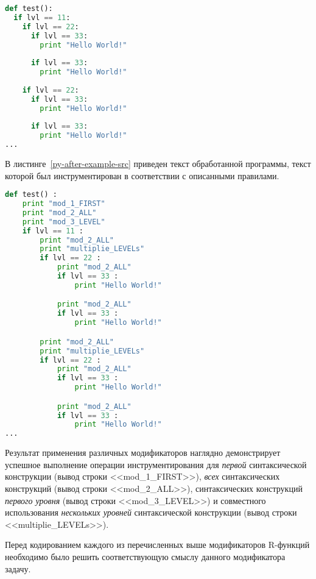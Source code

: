 \begin{lstlisting}[frame=single, language=Python, label={py-before-example-src}, caption={Пример исходной программы на языке Python.}]
def test():
  if lvl == 11:
    if lvl == 22:
      if lvl == 33:
        print "Hello World!"
      
      if lvl == 33:
        print "Hello World!"
    
    if lvl == 22:
      if lvl == 33:
        print "Hello World!"
      
      if lvl == 33:
        print "Hello World!"
...
\end{lstlisting}

В листинге~\ref{py-after-example-src} приведен текст обработанной программы, текст которой был инструментирован в соответствии с описанными правилами.

\begin{lstlisting}[frame=single, language=Python, label={py-after-example-src}, caption={Результат применения различных модификаторов к исходной программе.}]
def test() :
    print "mod_1_FIRST"
    print "mod_2_ALL"
    print "mod_3_LEVEL"
    if lvl == 11 :
        print "mod_2_ALL"
        print "multiplie_LEVELs"
        if lvl == 22 :
            print "mod_2_ALL"
            if lvl == 33 :
                print "Hello World!"

            print "mod_2_ALL"
            if lvl == 33 :
                print "Hello World!"

        print "mod_2_ALL"
        print "multiplie_LEVELs"
        if lvl == 22 :
            print "mod_2_ALL"
            if lvl == 33 :
                print "Hello World!"

            print "mod_2_ALL"
            if lvl == 33 :
                print "Hello World!"
...
\end{lstlisting}

Результат применения различных модификаторов наглядно демонстрирует успешное выполнение операции инструментирования для
\textit{первой} синтаксической конструкции (вывод строки <<mod\_1\_FIRST>>),
\textit{всех} синтаксических конструкций (вывод строки <<mod\_2\_ALL>>),
синтаксических конструкций \textit{первого уровня} (вывод строки <<mod\_3\_LEVEL>>) и
совместного использования \textit{нескольких уровней} синтаксической конструкции (вывод строки <<multiplie\_LEVELs>>).

Перед кодированием каждого из перечисленных выше модификаторов R-функций необходимо было решить соответствующую смыслу данного модификатора задачу.

